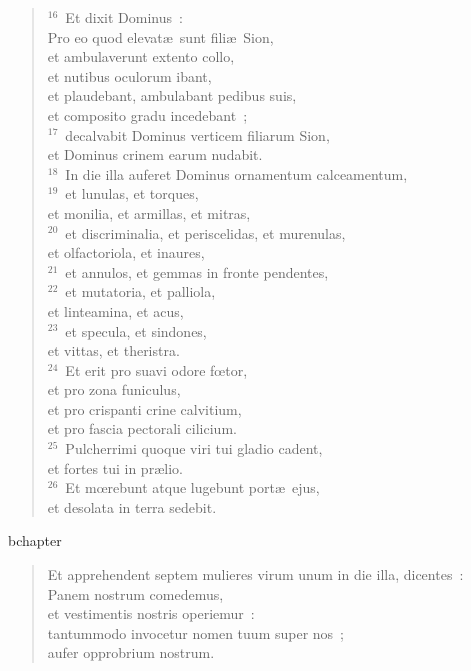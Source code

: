 \begin{verse}${}^{16}$~Et dixit Dominus~:\\ Pro eo quod elevat\ae\ sunt fili\ae\ Sion,\\ et ambulaverunt extento collo,\\ et nutibus oculorum ibant,\\ et plaudebant, ambulabant pedibus suis,\\ et composito gradu incedebant~;\\
${}^{17}$~decalvabit Dominus verticem filiarum Sion,\\ et Dominus crinem earum nudabit.\\
${}^{18}$~In die illa auferet Dominus ornamentum calceamentum,\\
${}^{19}$~et lunulas, et torques,\\ et monilia, et armillas, et mitras,\\
${}^{20}$~et discriminalia, et periscelidas, et murenulas,\\ et olfactoriola, et inaures,\\
${}^{21}$~et annulos, et gemmas in fronte pendentes,\\
${}^{22}$~et mutatoria, et palliola,\\ et linteamina, et acus,\\
${}^{23}$~et specula, et sindones,\\ et vittas, et theristra.\\
${}^{24}$~Et erit pro suavi odore fœtor,\\ et pro zona funiculus,\\ et pro crispanti crine calvitium,\\ et pro fascia pectorali cilicium.\\
${}^{25}$~Pulcherrimi quoque viri tui gladio cadent,\\ et fortes tui in pr\ae lio.\\
${}^{26}$~Et mœrebunt atque lugebunt port\ae\ ejus,\\ et desolata in terra sedebit.\end{verse}


bchapter\begin{verse}\vspace{-19pt}Et apprehendent septem mulieres virum unum in die illa, dicentes~:\\ Panem nostrum comedemus,\\ et vestimentis nostris operiemur~:\\ tantummodo invocetur nomen tuum super nos~;\\ aufer opprobrium nostrum.\end{verse}


